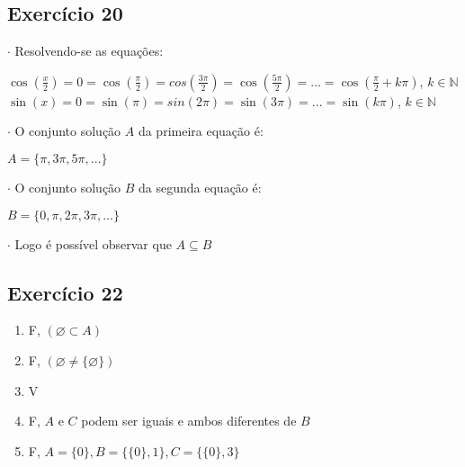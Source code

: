 \documentclass[12pt,a4paper]{article}
\begin{document}
\subsection*{Exercício 20}
$\cdot$ Resolvendo-se as equações:
\begin{center}
$\cos(\frac{x}{2})=0=\cos(\frac{\pi}{2})=cos(\frac{3\pi}{2})=\cos(\frac{5\pi}{2})= ... =\cos(\frac{\pi}{2} + k\pi)$, $k\in \mathbb{N}$ \\
\vspace{0.5cm}
$\sin(x)=0=\sin(\pi)=sin(2\pi)=\sin(3\pi)= ... =\sin(k\pi)$, $k\in \mathbb{N}$ \\
\end{center}
$\cdot$ O conjunto solução $A$ da primeira equação é:
\begin{center}
$A= \{\pi,3\pi,5\pi,...\}$
\end{center}
$\cdot$ O conjunto solução $B$ da segunda equação é:
\begin{center}
$B = \{0,\pi,2\pi,3\pi,...\}$
\end{center}
$\cdot$ Logo é possível observar que $A \subseteq B$
\subsection*{Exercício 22}
\begin{enumerate}[label=\textbf{\alph*.}]
\item F, \quad $(\varnothing \subset A)$
\item F, \quad $(\varnothing \neq \{\varnothing\}) $
\item V
\item F, \quad $A$ e $C$ podem ser iguais e ambos diferentes de $B$
\item F, \quad $A=\{0\}, B=\{\{0\},1\}, C=\{\{0\},3\}$
\end{enumerate}
\end{document}
